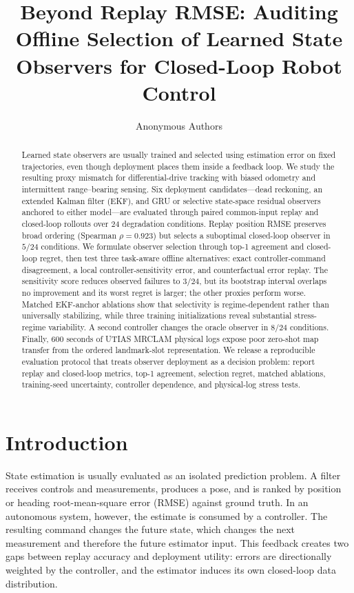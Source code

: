 \documentclass{article}
\title{Beyond Replay RMSE: Auditing Offline Selection of Learned State Observers for Closed-Loop Robot Control}
\author{Anonymous Authors}
\begin{document}
\maketitle

\begin{abstract}
Learned state observers are usually trained and selected using estimation error on fixed trajectories, even though deployment places them inside a feedback loop. We study the resulting proxy mismatch for differential-drive tracking with biased odometry and intermittent range--bearing sensing. Six deployment candidates---dead reckoning, an extended Kalman filter (EKF), and GRU or selective state-space residual observers anchored to either model---are evaluated through paired common-input replay and closed-loop rollouts over 24 degradation conditions. Replay position RMSE preserves broad ordering (Spearman $\rho=0.923$) but selects a suboptimal closed-loop observer in $5/24$ conditions. We formulate observer selection through top-1 agreement and closed-loop regret, then test three task-aware offline alternatives: exact controller-command disagreement, a local controller-sensitivity error, and counterfactual error replay. The sensitivity score reduces observed failures to $3/24$, but its bootstrap interval overlaps no improvement and its worst regret is larger; the other proxies perform worse. Matched EKF-anchor ablations show that selectivity is regime-dependent rather than universally stabilizing, while three training initializations reveal substantial stress-regime variability. A second controller changes the oracle observer in $8/24$ conditions. Finally, 600 seconds of UTIAS MRCLAM physical logs expose poor zero-shot map transfer from the ordered landmark-slot representation. We release a reproducible evaluation protocol that treats observer deployment as a decision problem: report replay and closed-loop metrics, top-1 agreement, selection regret, matched ablations, training-seed uncertainty, controller dependence, and physical-log stress tests.
\end{abstract}

\section{Introduction}
State estimation is usually evaluated as an isolated prediction problem. A filter receives controls and measurements, produces a pose, and is ranked by position or heading root-mean-square error (RMSE) against ground truth. In an autonomous system, however, the estimate is consumed by a controller. The resulting command changes the future state, which changes the next measurement and therefore the future estimator input. This feedback creates two gaps between replay accuracy and deployment utility: errors are directionally weighted by the controller, and the estimator induces its own closed-loop data distribution.
\end{document}
